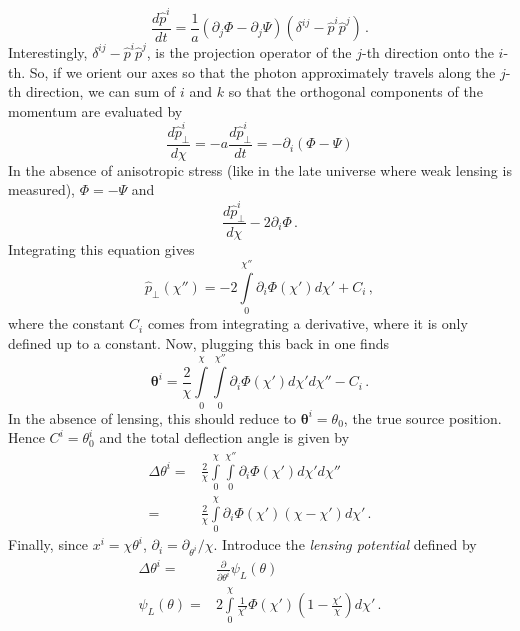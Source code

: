 \begin{equation}
	\frac{d\hat{p}^i}{dt} = \frac{1}{a}\left( \partial_j\Phi - \partial_j\Psi \right)(\delta^{ij}-\hat{p}^i\hat{p}^j)\,.
\end{equation}
Interestingly, $\delta^{ij}-\hat p^i \hat p^j$, is the projection operator of the $j$-th direction onto the $i$-th. So, if we orient our axes so that the photon approximately travels along the $j$-th direction, we can sum of $i$ and $k$ so that the orthogonal components of the momentum are evaluated by
\begin{equation}
	\frac{d\hat{p}^i_\perp}{d\chi} = - a \frac{d\hat{p}^i_\perp}{dt} = -\partial_i(\Phi-\Psi)
\end{equation}
In the absence of anisotropic stress (like in the late universe where weak lensing is measured), $\Phi=-\Psi$ and 
\begin{equation}
	\frac{d\hat{p}^i_\perp}{d\chi} -2\partial_i\Phi\,.
\end{equation}
Integrating this equation gives
\begin{equation}
	\hat p_\perp (\chi'') = -2\int\limits_0^{\chi''}\partial_i\Phi(\chi') d\chi' + C_i\,,
\end{equation}
where the constant $C_i$ comes from integrating a derivative, where it is only defined up to a constant. Now, plugging this back in one finds
\begin{equation}
	\mathbf{\theta}^i = \frac{2}{\chi}\int\limits_0^\chi \int\limits_0^{\chi''}\partial_i\Phi(\chi') d\chi' d\chi'' - C_i\,.
\end{equation}
In the absence of lensing, this should reduce to $\mathbf{\theta}^i = \theta_0$, the true source position. Hence $C^i=\theta^i_0$ and the total deflection angle is given by
\begin{equation}
	\begin{split}
		\Delta\theta^i =& \frac{2}{\chi}\int\limits_0^\chi \int\limits_0^{\chi''}\partial_i\Phi(\chi') d\chi' d\chi''\\
		=& \frac{2}{\chi}\int\limits_0^\chi \partial_i\Phi(\chi') (\chi-\chi') d\chi'\,.
	\end{split}
\end{equation}
Finally, since $x^i=\chi\theta^i$, $\partial_i = \partial_{\theta^i}/\chi$. Introduce the \textit{lensing potential} defined by
\begin{equation}
	\begin{split}
		\Delta\theta^i =& \frac{\partial}{\partial \theta^i}\psi_L(\theta) \\
		\psi_L(\theta) =& 2\int\limits_0^\chi \frac{1}{\chi'}\Phi(\chi') \left(1-\frac{\chi'}{\chi}\right) d\chi'\,.
	\end{split}
\end{equation}
